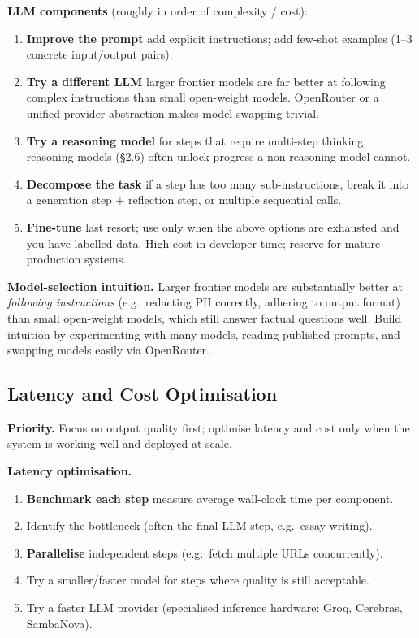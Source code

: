 \documentclass[a4paper,11pt]{article}
\begin{document}
\textbf{LLM components} (roughly in order of complexity / cost):
\begin{enumerate}[noitemsep, leftmargin=1.4em]
  \item \textbf{Improve the prompt} \textemdash{} add explicit
        instructions; add few-shot examples (1–3 concrete
        input/output pairs).
  \item \textbf{Try a different LLM} \textemdash{} larger frontier
        models are far better at following complex instructions than
        small open-weight models. OpenRouter or a unified-provider
        abstraction makes model swapping trivial.
  \item \textbf{Try a reasoning model} \textemdash{} for steps that
        require multi-step thinking, reasoning models (§2.6) often
        unlock progress a non-reasoning model cannot.
  \item \textbf{Decompose the task} \textemdash{} if a step has too
        many sub-instructions, break it into a generation step +
        reflection step, or multiple sequential calls.
  \item \textbf{Fine-tune} \textemdash{} last resort; use only when
        the above options are exhausted and you have labelled data.
        High cost in developer time; reserve for mature production
        systems.
\end{enumerate}

\begin{ambercallout}
\textbf{Model-selection intuition.}
Larger frontier models are substantially better at \emph{following
instructions} (e.g.\ redacting PII correctly, adhering to output
format) than small open-weight models, which still answer factual
questions well. Build intuition by experimenting with many models,
reading published prompts, and swapping models easily via OpenRouter.
\end{ambercallout}

\subsection{Latency and Cost Optimisation}

\textbf{Priority.} Focus on output quality first; optimise latency
and cost only when the system is working well and deployed at scale.

\textbf{Latency optimisation.}
\begin{enumerate}[noitemsep, leftmargin=1.4em]
  \item \textbf{Benchmark each step} \textemdash{} measure average
        wall-clock time per component.
  \item Identify the bottleneck (often the final LLM step, e.g.\
        essay writing).
  \item \textbf{Parallelise} independent steps (e.g.\ fetch multiple
        URLs concurrently).
  \item Try a smaller/faster model for steps where quality is still
        acceptable.
  \item Try a faster LLM provider (specialised inference hardware:
        Groq, Cerebras, SambaNova).
\end{enumerate}
\end{document}
